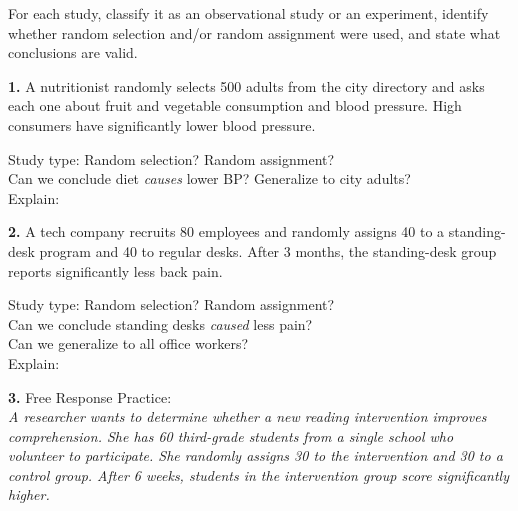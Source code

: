 \documentclass[10pt]{article}
\begin{document}
\namedateperiod

\vspace{0.1in}

\begin{practicebox}
\small
For each study, classify it as an observational study or an experiment, identify
whether random selection and/or random assignment were used, and state what
conclusions are valid.

\vspace{8pt}
\textbf{1.} A nutritionist randomly selects 500 adults from the city directory and
asks each one about fruit and vegetable consumption and blood pressure. High consumers
have significantly lower blood pressure.

\vspace{6pt}
Study type: \blank{5cm} \quad Random selection? \blank{2cm} \quad Random assignment? \blank{2cm}\\[6pt]
Can we conclude diet \emph{causes} lower BP? \blank{3cm} \quad Generalize to city adults? \blank{3cm}\\[6pt]
Explain: \writeline\\[1pt]\writeline

\vspace{8pt}
\textbf{2.} A tech company recruits 80 employees and randomly assigns 40 to a
standing-desk program and 40 to regular desks. After 3 months, the standing-desk
group reports significantly less back pain.

\vspace{6pt}
Study type: \blank{5cm} \quad Random selection? \blank{2cm} \quad Random assignment? \blank{2cm}\\[6pt]
Can we conclude standing desks \emph{caused} less pain? \blank{3cm}\\[6pt]
Can we generalize to all office workers? \blank{3cm}\\[6pt]
Explain: \writeline\\[1pt]\writeline

\vspace{8pt}
\textbf{3.} Free Response Practice:\\
\textit{A researcher wants to determine whether a new reading intervention improves
comprehension. She has 60 third-grade students from a single school who volunteer
to participate. She randomly assigns 30 to the intervention and 30 to a control
group. After 6 weeks, students in the intervention group score significantly higher.}


\end{practicebox}
\end{document}
